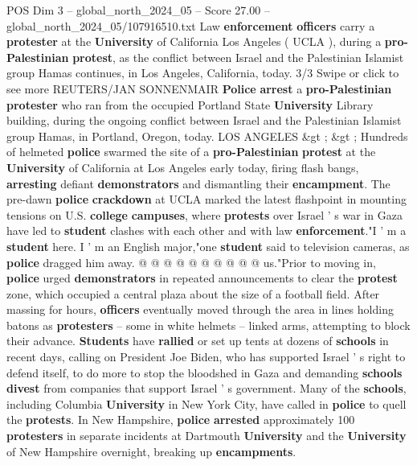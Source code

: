 \begin{textsample}{POS Dim 3 – global\_north\_2024\_05 – Score 27.00 – global\_north\_2024\_05/107916510.txt}  \label{ex:f3_pos_011}
Law \textbf{enforcement} \textbf{officers} carry a \textbf{protester} at the \textbf{University} of California Los Angeles ( UCLA ), during a \textbf{pro-Palestinian} \textbf{protest}, as the conflict between Israel and the Palestinian Islamist group Hamas continues, in Los Angeles, California, today. 3/3 Swipe or click to see more REUTERS/JAN SONNENMAIR \textbf{Police} \textbf{arrest} a \textbf{pro-Palestinian} \textbf{protester} who ran from the occupied Portland State \textbf{University} Library building, during the ongoing conflict between Israel and the Palestinian Islamist group Hamas, in Portland, Oregon, today.
LOS ANGELES \&gt ; \&gt ; Hundreds of helmeted \textbf{police} swarmed the site of a \textbf{pro-Palestinian} \textbf{protest} at the \textbf{University} of California at Los Angeles early today, firing flash bangs, \textbf{arresting} defiant \textbf{demonstrators} and dismantling their \textbf{encampment}.
The pre-dawn \textbf{police} \textbf{crackdown} at UCLA marked the latest flashpoint in mounting tensions on U.S. \textbf{college} \textbf{campuses}, where \textbf{protests} over Israel ' s war in Gaza have led to \textbf{student} clashes with each other and with law \textbf{enforcement}."I ' m a \textbf{student} here.
I ' m an English major,"one \textbf{student} said to television cameras, as \textbf{police} dragged him away. @ @ @ @ @ @ @ @ @ @ us."Prior to moving in, \textbf{police} urged \textbf{demonstrators} in repeated announcements to clear the \textbf{protest} zone, which occupied a central plaza about the size of a football field.
After massing for hours, \textbf{officers} eventually moved through the area in lines holding batons as \textbf{protesters} -- some in white helmets -- linked arms, attempting to block their advance. \textbf{Students} have \textbf{rallied} or set up tents at dozens of \textbf{schools} in recent days, calling on President Joe Biden, who has supported Israel ' s right to defend itself, to do more to stop the bloodshed in Gaza and demanding \textbf{schools} \textbf{divest} from companies that support Israel ' s government.
Many of the \textbf{schools}, including Columbia \textbf{University} in New York City, have called in \textbf{police} to quell the \textbf{protests}.
In New Hampshire, \textbf{police} \textbf{arrested} approximately 100 \textbf{protesters} in separate incidents at Dartmouth \textbf{University} and the \textbf{University} of New Hampshire overnight, breaking up \textbf{encampments}.

\end{textsample}
